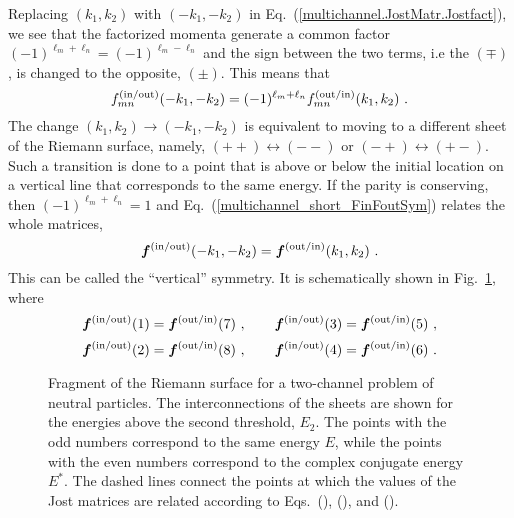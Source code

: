 \documentclass[12pt]{article}
\begin{document}
Replacing $(k_1,k_2)$ with $(-k_1,-k_2)$ in
Eq.~(\ref{multichannel.JostMatr.Jostfact}), we see that the factorized momenta
generate a common factor $(-1)^{\ell_m+\ell_n}=(-1)^{\ell_m-\ell_n}$ and the
sign between the two terms, i.e the $(\mp)$, is changed to the opposite,
$(\pm)$. This means that
\begin{equation}
\label{multichannel_short_FinFoutSym}
      f^{\rm (in/out)}_{mn}(-k_1,-k_2)=
      (-1)^{\ell_m+\ell_n}f^{\rm (out/in)}_{mn}(k_1,k_2)\ .
\end{equation}
The change $(k_1,k_2)\to(-k_1,-k_2)$ is equivalent to moving to a different
sheet of the Riemann surface, namely, $(++)\leftrightarrow(--)$ or
$(-+)\leftrightarrow(+-)$. Such a transition is done to a point that is above
or below the initial location on a vertical line that corresponds to the same
energy. If the parity is conserving, then $(-1)^{\ell_m+\ell_n}=1$ and
Eq.~(\ref{multichannel_short_FinFoutSym}) relates the whole matrices,
\begin{equation}
\label{sign_symm}
      \bm{f}^{\rm (in/out)}(-k_1,-k_2)=
      \bm{f}^{\rm (out/in)}(k_1,k_2)\ .
\end{equation}
This can be called the ``vertical'' symmetry. It is schematically shown in 
Fig.~\ref{fig.multi_Riemann_symmetries}, where
$$
      \bm{f}^{\rm (in/out)}(1)=
      \bm{f}^{\rm (out/in)}(7)\ ,
      \qquad
      \bm{f}^{\rm (in/out)}(3)=
      \bm{f}^{\rm (out/in)}(5)\ ,
$$
$$
      \bm{f}^{\rm (in/out)}(2)=
      \bm{f}^{\rm (out/in)}(8)\ ,
      \qquad
      \bm{f}^{\rm (in/out)}(4)=
      \bm{f}^{\rm (out/in)}(6)\ .
$$

\begin{figure}[ht!]
\centerline{}
\caption{\sf
Fragment of the Riemann surface for a two-channel problem of neutral particles. 
The interconnections of the sheets are shown for the energies above the second 
threshold, $E_2$. The points with the 
odd numbers 
correspond to the same energy $E$, while the points with the even numbers 
correspond to the complex conjugate energy $E^*$.
The dashed lines connect the points at which the values of the Jost 
matrices are related according to 
Eqs.~(\protect{\ref{sign_symm}}), 
(\protect{\ref{multichannel_short_finSwartz}}), and 
(\protect{\ref{multichannel_short_FinCombSym}}).
}
\label{fig.multi_Riemann_symmetries}
\end{figure}
\end{document}

